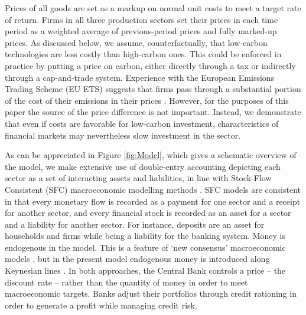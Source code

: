 \documentclass[authoryear]{article}
\begin{document}
Prices of all goods are set as a markup on normal unit costs to meet a target rate of return. Firms in all three production sectors set their prices in each time period as a weighted average of previous-period prices and fully marked-up prices. As discussed below, we assume, counterfactually, that low-carbon technologies are less costly than high-carbon ones. This could be enforced in practice by putting a price on carbon, either directly through a tax or indirectly through a cap-and-trade system. Experience with the European Emissions Trading Scheme (EU ETS) suggests that firms pass through a substantial portion of the cost of their emissions in their prices \citep{sijm_co2_2006,zachmann_first_2008}. However, for the purposes of this paper the source of the price difference is not important. Instead, we demonstrate that even if costs are favorable for low-carbon investment, characteristics of financial markets may nevertheless slow investment in the sector.

As can be appreciated in Figure \ref{fig:Model}, which gives a schematic overview of the model, we make extensive use of double-entry accounting depicting each sector as a set of interacting assets and liabilities, in line with Stock-Flow Consistent (SFC) macroeconomic modelling methods \citep{Caverzasi2015, Godley:2007}. SFC models are consistent in that every monetary flow is recorded as a payment for one sector and a receipt for another sector, and every financial stock is recorded as an asset for a sector and a liability for another sector. For instance, deposits are an asset for households and firms while being a liability for the banking system. Money is endogenous in the model. This is a feature of `new consensus' macroeconomic models \citep{meyer_does_2001}, but in the present model endogenous money is introduced along Keynesian lines \citep{arestis_nature_2006}. In both approaches, the Central Bank controls a price -- the discount rate -- rather than the quantity of money in order to meet macroeconomic targets. Banks adjust their portfolios through credit rationing in order to generate a profit while managing credit risk.
\end{document}
